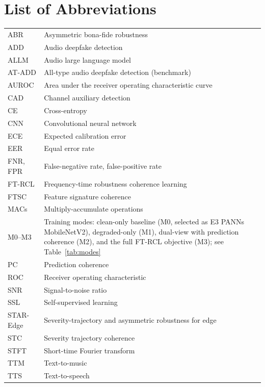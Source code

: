 \chapter*{List of Abbreviations}
\begingroup
\singlespacing\small
\renewcommand{\arraystretch}{1.25}
\noindent
\begin{tabular}{@{}p{}p{}@{}}
ABR      & Asymmetric bona-fide robustness \\
ADD      & Audio deepfake detection \\
ALLM     & Audio large language model \\
AT-ADD   & All-type audio deepfake detection (benchmark) \\
AUROC    & Area under the receiver operating characteristic curve \\
CAD      & Channel auxiliary detection \\
CE       & Cross-entropy \\
CNN      & Convolutional neural network \\
ECE      & Expected calibration error \\
EER      & Equal error rate \\
FNR, FPR & False-negative rate, false-positive rate \\
FT-RCL   & Frequency-time robustness coherence learning \\
FTSC     & Feature signature coherence \\
MACs     & Multiply-accumulate operations \\
M0--M3   & Training modes: clean-only baseline (M0, selected as E3 PANNs MobileNetV2), degraded-only (M1), dual-view with prediction coherence (M2), and the full FT-RCL objective (M3); see Table~\ref{tab:modes} \\
PC       & Prediction coherence \\
ROC      & Receiver operating characteristic \\
SNR      & Signal-to-noise ratio \\
SSL      & Self-supervised learning \\
STAR-Edge & Severity-trajectory and asymmetric robustness for edge \\
STC      & Severity trajectory coherence \\
STFT     & Short-time Fourier transform \\
TTM      & Text-to-music \\
TTS      & Text-to-speech \\
\end{tabular}
\endgroup

